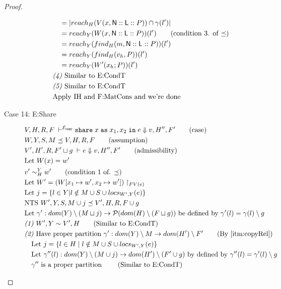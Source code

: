 \documentclass{easychair}
\newcommand{\ms}[1]{\ensuremath{\mathsf{#1}}}
\newcommand{\irl}[1]{\mathtt{#1}}
\newcommand{\sharecpcst}[4]{\irl{share}\;#1\;\irl{as}\;#2,#3\;\irl{in}\;#4}
\newcommand{\veq}[4]{#3 \sim^{#1}_{#2} #4}
\newcommand{\copySem}{\ensuremath{\mathcal{E}_{\ms{copy}}}}
\theoremstyle{definition}
\begin{document}
\begin{proof}
\begin{description}
\begin{align*}
		&\quad = |reach_{H}(V(x,\ms{N}::\ms{L}::P)) \cap \gamma(l')|\\
		&\quad = reach_{Y}(W(x,\ms{N}::\ms{L}::P))(l') \tag{condition 3. of $\preceq$}\\
		&\quad = reach_{Y}(find_H(m,\ms{N}::\ms{L}::P))(l') \\
		&\quad = reach_{Y}(find_H(v_h,P))(l') \\
		&\quad = reach_{Y}(W'(x_h;P))(l') \\
		&\emph{(4) } \text{Similar to E:CondT}\\
		&\emph{(5) } \text{Similar to E:CondT}\\
		&\text{Apply IH and F:MatCons and we're done}
  \end{align*}
  \item[Case 14: E:Share]
	\begin{align*}
		&V,H,R,F \; \vdash^{\copySem} \sharecpcst{x}{x_1}{x_2}{e} \Downarrow v,H'',F' \tag{case}\\
		&W,Y,S,M \preceq V,H,R,F \tag{assumption}\\
		&V',H',R,F' \sqcup g \; \vdash e \Downarrow v,H'',F' \tag{admissibility}\\
		&\text{Let } W(x) = w'\\
		&\veq{Y}{H}{v'}{w'} \tag{condition 1 of. $\preceq$}\\
		&\text{Let } W' = (W[x_1 \mapsto w', x_2 \mapsto w'])\restriction_{FV(e)}\\
		&\text{Let } j = \{l \in Y | l \notin M \cup S \cup locs_{W',Y}(e) \}\\
		&\text{NTS } W',Y,S,M \cup j \preceq V',H,R,F \cup g\\
		&\text{Let } \gamma' : dom(Y) \setminus (M \sqcup j) 
		\to \mathcal{P}(dom(H) \setminus (F \sqcup g)) \text{ be defined by } 
		\gamma'(l) = \gamma(l) \setminus g\\
		&\emph{(1) } W',Y \sim V',H \tag{Similar to E:CondT}\\
		&\emph{(2) } \text{Have proper partition } \gamma' : 
			dom(Y) \setminus M \to dom(H') \setminus F' \tag{By $\ref{itm:copyRel}$}\\
		&\quad \text{Let } j = \{l \in H \mid l \notin M \cup S \cup locs_{W',Y}(e)\}\\
		&\quad \text{Let } \gamma''(l) : dom(Y) \setminus (M \cup j) \to dom(H') \setminus (F' \cup g)
			\text{ by defined by } \gamma''(l) =  \gamma'(l) \setminus g\\
		&\quad \gamma'' \text{ is a proper partition } \tag{Similar to E:CondT}\\

\end{align*}
\end{description}
\end{proof}
\end{document}
